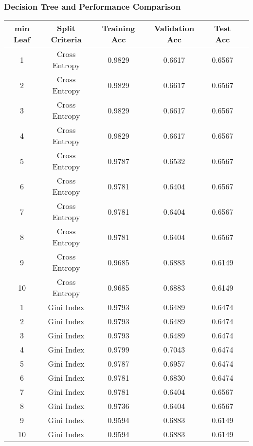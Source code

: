 \documentclass[letter,11pt]{article}
\begin{document}
\subsubsection{Decision Tree and Performance Comparison}
\begin{center}
	\begin{tabular}{|c| c |c |c|c|c|} 
		\hline
		min Leaf & Split Criteria & Training Acc & Validation Acc & Test Acc\\ [0.5ex] 
		\hline
		1 & Cross Entropy &  0.9829 &  0.6617 & 0.6567    \\ 
		\hline
		2 & Cross Entropy & 0.9829 &  0.6617 & 0.6567   \\ 
		\hline
		3 & Cross Entropy & 0.9829 &  0.6617 & 0.6567  \\ 
		\hline	
		4 & Cross Entropy & 0.9829 &  0.6617 & 0.6567  \\ 
		\hline
		5 & Cross Entropy & 0.9787 & 0.6532  & 0.6567   \\ 
		\hline
		6 & Cross Entropy & 0.9781 & 0.6404  & 0.6567    \\ 
		\hline
		7 & Cross Entropy & 0.9781 & 0.6404  & 0.6567   \\ 
		\hline
		8 & Cross Entropy & 0.9781 & 0.6404 & 0.6567   \\ 
		\hline
		9 & Cross Entropy & 0.9685 & 0.6883 & 0.6149   \\ 
		\hline
		10 & Cross Entropy & 0.9685 & 0.6883 & 0.6149 \\ 
		\hline	
		1 & Gini Index & 0.9793 & 0.6489 & 0.6474   \\ 
		\hline
		2 & Gini Index & 0.9793 & 0.6489 & 0.6474    \\ 
		\hline
		3 & Gini Index & 0.9793 & 0.6489 & 0.6474    \\ 
		\hline	
		4 & Gini Index & 0.9799 & 0.7043 & 0.6474   \\ 
		\hline
		5 & Gini Index & 0.9787 & 0.6957 & 0.6474   \\ 
		\hline
		6 & Gini Index & 0.9781 & 0.6830 & 0.6474   \\ 
		\hline
		7 & Gini Index & 0.9781 & 0.6404 & 0.6567    \\ 
		\hline
		8 & Gini Index & 0.9736 & 0.6404 & 0.6567    \\ 
		\hline
		9 & Gini Index & 0.9594 & 0.6883 & 0.6149  \\ 
		\hline
		10 & Gini Index & 0.9594 & 0.6883 & 0.6149  \\ 
		\hline

	\end{tabular}
\end{center}
		
\end{document}
